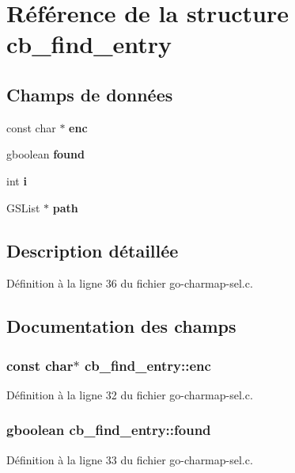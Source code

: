 \section{Référence de la structure cb\_\-find\_\-entry}
\label{structcb__find__entry}
\subsection*{Champs de données}
\begin{DoxyCompactItemize}
\item 
const char $\ast$ {\bf enc}
\item 
gboolean {\bf found}
\item 
int {\bf i}
\item 
GSList $\ast$ {\bf path}
\end{DoxyCompactItemize}


\subsection{Description détaillée}


Définition à la ligne 36 du fichier go-\/charmap-\/sel.c.



\subsection{Documentation des champs}
\subsubsection[{enc}]{\setlength{\rightskip}{0pt plus 5cm}const char$\ast$ {\bf cb\_\-find\_\-entry::enc}}\label{structcb__find__entry_a53aa5270e1d5b5f0c2df8c232cd696cb}


Définition à la ligne 32 du fichier go-\/charmap-\/sel.c.

\subsubsection[{found}]{\setlength{\rightskip}{0pt plus 5cm}gboolean {\bf cb\_\-find\_\-entry::found}}\label{structcb__find__entry_ab3f2bc990f468ee8869f102d3e55a117}


Définition à la ligne 33 du fichier go-\/charmap-\/sel.c.

